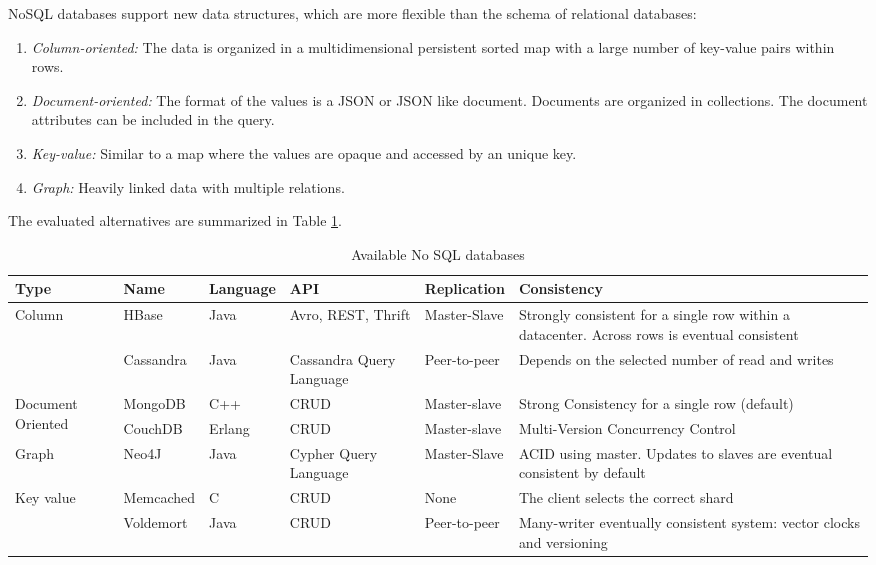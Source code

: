 \acs{NoSQL} databases support new data structures, which are more flexible than the schema of relational databases:
 \begin{enumerate}
 	\item \textit{Column-oriented:} The data is organized in a multidimensional persistent sorted map with a large number of key-value pairs within rows.
  	\item \textit{Document-oriented:} The format of the values is a JSON or JSON like document. Documents are organized in collections. The document attributes can be included in the query.
  	\item \textit{Key-value:} Similar to a map where the values are opaque and accessed by an unique key.
  	\item \textit{Graph:} Heavily linked data with multiple relations.
  \end{enumerate} 

The evaluated alternatives are summarized in Table \ref{tab:no_sql_databases}. 




\begin{center}
\begin{table}[ht]
\begin{tabular}{|m{1.5cm}|m{1.8cm}|m{1.6cm}|m{1.8cm}|m{1.7cm}|m{5cm}|}\hline
\textbf{Type}  & \textbf{Name} & \textbf{Language} & \textbf{API} & \textbf{Replication}  & \textbf{Consistency} \\ \hline

\multirow{2}{*}{Column} 
	& HBase 		& Java  & Avro, REST, Thrift & Master-Slave & Strongly consistent for a single row within a datacenter. Across rows is eventual consistent \\ \cline{2-6}
	& Cassandra 	& Java  & Cassandra Query \newline Language & Peer-to-peer  & Depends on the selected number of read and writes \\ \hline

\multirow{2}{1.5cm}{Document Oriented} 
	& MongoDB  	& C++  		& \acs{CRUD}  	& Master-slave & Strong Consistency for a single row (default) \\ \cline{2-6} 
	& CouchDB 	& Erlang   	& \acs{CRUD} 	& Master-slave & Multi-Version Concurrency Control \\ \hline

Graph 
	& Neo4J 	& Java  	& Cypher Query \newline Language  & Master-Slave & ACID using master. Updates to slaves are eventual consistent by default \\ \hline


\multirow{2}{1.5cm}{Key value}         
	& Memcached   	& C  		& \acs{CRUD}  	& None 			& The client selects the correct shard \\ \cline{2-6} 
	& Voldemort  	& Java		& \acs{CRUD} 	& Peer-to-peer 		& Many-writer eventually consistent system: vector clocks and versioning  \\ \hline
\end{tabular}
\caption{Available No \ac{SQL} databases}
\label{tab:no_sql_databases}
\end{table}
\end{center}

